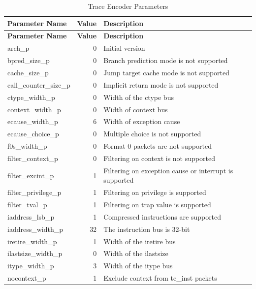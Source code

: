 \documentclass[main\_\_EN.tex]{subfiles}
\begin{document}
\begin{longtable}[c]{ |l|r|l| }
    \caption{Trace Encoder Parameters}
    \label{tab:encoder_parameters}
    \\\hline
    \rowcolor{lightgray}
    \textbf{Parameter Name} & \textbf{Value} & \textbf{Description} \\\hline
    \endfirsthead

    \hline
    \rowcolor{lightgray}
    \textbf{Parameter Name} & \textbf{Value} & \textbf{Description} \\\hline
    \endhead
    \endfoot
    \endlastfoot

    arch\_p & 0 & Initial version  \\\hline
    bpred\_size\_p & 0 & Branch prediction mode is not supported \\\hline
    cache\_size\_p & 0 & Jump target cache mode is not supported \\\hline
    call\_counter\_size\_p & 0 & Implicit return mode is not supported \\\hline
    ctype\_width\_p & 0 & Width of the ctype bus \\\hline
    context\_width\_p & 0 & Width of context bus \\\hline
    ecause\_width\_p & 6 & Width of exception cause \\\hline
    ecause\_choice\_p & 0 & Multiple choice is not supported \\\hline
    f0s\_width\_p & 0 & Format 0 packets are not supported \\\hline
    filter\_context\_p & 0 & Filtering on context is not supported \\\hline
    filter\_excint\_p & 1 & Filtering on exception cause or interrupt is supported \\\hline
    filter\_privilege\_p & 1 & Filtering on privilege is supported \\\hline
    filter\_tval\_p & 1 & Filtering on trap value is supported \\\hline
    iaddress\_lsb\_p & 1 & Compressed instructions are supported \\\hline
    iaddress\_width\_p & 32 & The instruction bus is 32-bit \\\hline
    iretire\_width\_p & 1 & Width of the iretire bus \\\hline
    ilastsize\_width\_p & 0 & Width of the ilastsize \\\hline
    itype\_width\_p & 3 & Width of the itype bus \\\hline
    nocontext\_p & 1 & Exclude context from te\_inst packets \\\hline

\end{longtable}
\end{document}

